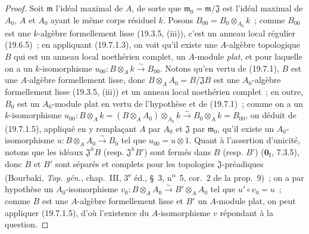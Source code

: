 \begin{proof}
Soit $\mathfrak m$ l'idéal maximal de $A$, de sorte que
$\mathfrak m_0=\mathfrak m/\mathfrak J$ est l'idéal maximal de $A_0$, $A$ et
$A_0$ ayant le même corps résiduel $k$. Posons
$B_{00}=B_0\otimes_{A_0}k$~; comme $B_{00}$ est une $k$-algèbre formellement
lisse (19.3.5, (iii)), c'est un anneau local régulier (19.6.5)~; en appliquant
(19.7.1.3), on voit qu'il existe une $A$-algèbre topologique $B$ qui est un
anneau local noethérien complet, un $A$-module \emph{plat}, et pour laquelle on a un
$k$-isomorphisme
$u_{00}:B\otimes_A k\xrightarrow{\sim}B_{00}$. Notons qu'en vertu de (19.7.1),
$B$ est une $A$-algèbre formellement lisse, donc
$B\otimes_A A_0=B/\mathfrak JB$ est une $A_0$-algèbre formellement lisse
(19.3.5, (iii)) et un anneau local noethérien complet~; en outre, $B_0$ est un
$A_0$-module plat en vertu de l'hypothèse et de (19.7.1)~; comme on a un
$k$-isomorphisme
$u_{00}:B\otimes_A k=(B\otimes_A A_0)\otimes_{A_0}k
\xrightarrow{\sim}B_0\otimes_A k=B_{00}$,
on déduit de (19.7.1.5), appliqué en y remplaçant $A$ par $A_0$ et
$\mathfrak J$ par $\mathfrak m_0$, qu'il existe un $A_0$-isomorphisme
$u:B\otimes_A A_0\xrightarrow{\sim}B_0$ tel que $u_{00}=u\otimes1$. Quant à
l'assertion d'unicité, notons que les idéaux $\mathfrak J^hB$ (resp.
$\mathfrak J^hB'$) sont fermés dans $B$ (resp. $B'$)
($\mathbf 0_{\mathrm I}$, 7.3.5), donc $B$ et $B'$ sont séparés et complets
pour les topologies $\mathfrak J$-préadiques (Bourbaki, \emph{Top. gén.},
chap.~III, 3\textsuperscript{e} éd., §~3, n\textsuperscript{o}~5, cor.~2 de la
prop.~9)~; on a par hypothèse un $A_0$-isomorphisme
$v_0:B\otimes_A A_0\xrightarrow{\sim}B'\otimes_A A_0$ tel que
$u'\circ v_0=u$~; comme $B$ est une $A$-algèbre formellement lisse et $B'$ un
$A$-module plat, on peut appliquer (19.7.1.5), d'où l'existence du
$A$-isomorphisme $v$ répondant à la question.
\end{proof}

